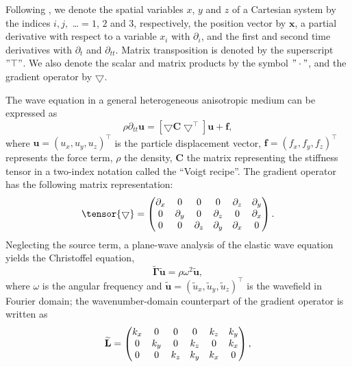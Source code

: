 Following \cite{carcione:2007},
we denote the spatial variables $x$, $y$ and $z$ of a Cartesian system by
the indices $i, j,$ \ldots $=1$, $2$ and $3$, respectively, the position vector by
$\mathbf{x}$, a partial derivative with respect to a variable $x_i$ with $\partial_i$,
and the first and second time derivatives with $\partial_t$ and $\partial_{tt}$.
Matrix transposition is denoted by the superscript $"\top"$. We also denote
the scalar and matrix products by the symbol $"\cdot"$, and the gradient operator by $\bigtriangledown$.

The wave equation in a general heterogeneous anisotropic medium can be expressed as
\begin{equation}
\label{eq:elastic}
\rho{\partial_{tt}\mathbf{u}} = [{\bigtriangledown}{\mathbf{C}{\bigtriangledown}^{\top}}]\mathbf{u} + \mathbf{f},
\end{equation}
where $\mathbf{u}=(u_x,u_y,u_z)^{\top}$ is the particle displacement vector,
$\mathbf{f}=(f_x,f_y,f_z)^{\top}$ represents
 the force term, $\rho$ the density, $\mathbf{C}$ the matrix representing the stiffness tensor in a
 two-index notation called the “Voigt recipe”. The gradient operator has
 the following matrix representation:
\begin{equation}
\label{eq:grad}
\tensor{\bigtriangledown} =
\begin{pmatrix}{\partial}_x &0 &0 &0& {\partial}_z & {\partial}_y \cr
0& {\partial}_y &0 & {\partial}_z  &0 & {\partial}_x \cr
0& 0& {\partial}_z & {\partial}_y & {\partial}_x &0 \end{pmatrix}.
\end{equation} 
Neglecting the source term, a plane-wave analysis of the elastic wave equation yields the 
Christoffel equation,
\begin{equation}
\label{eq:chris1}
\widetilde{\mathbf{\Gamma}}\widetilde{\mathbf{u}} = \rho{\omega}^2\widetilde{\mathbf{u}},
\end{equation}
where $\omega$ is the angular frequency and
$\widetilde{\mathbf{u}}=(\widetilde{u}_x,\widetilde{u}_y,\widetilde{u}_z)^{\top}$
is the wavefield in Fourier domain; the wavenumber-domain counterpart of the gradient
operator is written as
\begin{equation}
\label{eq:wavenumber}
\widetilde{\mathbf{L}}=
\begin{pmatrix}k_x & 0 &0 &0 & k_z & k_y \cr
         0 & k_y & 0 & k_z &0 & k_x \cr
         0 & 0 & k_z & k_y & k_x &0\end{pmatrix},
\end{equation}
